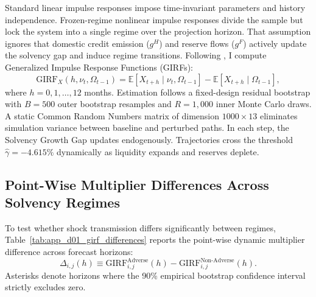 Standard linear impulse responses impose time-invariant parameters and history independence. Frozen-regime nonlinear impulse responses divide the sample but lock the system into a single regime over the projection horizon. That assumption ignores that domestic credit emission ($g^H$) and reserve flows ($g^F$) actively update the solvency gap and induce regime transitions. Following \citet{KoopPesaranPotter1996}, I compute Generalized Impulse Response Functions (GIRFs):
\begin{equation}
    \text{GIRF}_X(h, \nu_t, \Omega_{t-1}) = \mathbb{E}\left[ X_{t+h} \mid \nu_t, \Omega_{t-1} \right] - \mathbb{E}\left[ X_{t+h} \mid \Omega_{t-1} \right],
    \label{eq:app_d_girf_def}
\end{equation}
where $h = 0, 1, \dots, 12$ months. Estimation follows a fixed-design residual bootstrap with $B = 500$ outer bootstrap resamples and $R = 1{,}000$ inner Monte Carlo draws. A static Common Random Numbers matrix of dimension $1000 \times 13$ eliminates simulation variance between baseline and perturbed paths. In each step, the Solvency Growth Gap updates endogenously. Trajectories cross the threshold $\hat{\gamma} = -4.615\%$ dynamically as liquidity expands and reserves deplete.

\subsection{Point-Wise Multiplier Differences Across Solvency Regimes}
To test whether shock transmission differs significantly between regimes, Table~\ref{tab:app_d01_girf_differences} reports the point-wise dynamic multiplier difference across forecast horizons:
\begin{equation}
    \Delta_{i,j}(h) \equiv \text{GIRF}_{i,j}^{\text{Adverse}}(h) - \text{GIRF}_{i,j}^{\text{Non-Adverse}}(h).
    \label{eq:app_d_diff_test}
\end{equation}
Asterisks denote horizons where the 90\% empirical bootstrap confidence interval strictly excludes zero.



